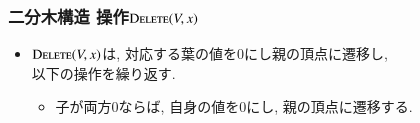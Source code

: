 \documentclass[main]{subfiles}
\begin{document}
\begin{frame}\frametitle{二分木構造 操作$\mathrm{\text{D\textsc{elete}}}(V,x)$}
\begin{itemize}
\item $\mathrm{\text{D\textsc{elete}}}(V,x)$は, 対応する葉の値を$0$にし親の頂点に遷移し, \\以下の操作を繰り返す.
\begin{itemize} \item 子が両方$0$ならば, 自身の値を$0$にし, 親の頂点に遷移する. \end{itemize}
\end{itemize}
\begin{columns}[t]
\begin{column}{0.45\linewidth}  \end{column}
\begin{column}{0.54\linewidth}  \end{column}
\end{columns}

\end{frame}
\end{document}
